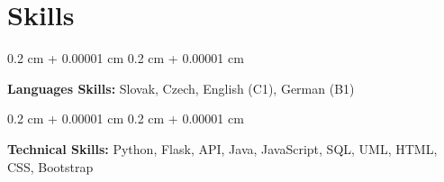 \documentclass[10pt, letterpaper]{article}
\newenvironment{onecolentry}{
    \begin{adjustwidth}{
        0.2 cm + 0.00001 cm
    }{
        0.2 cm + 0.00001 cm
    }
}{
    \end{adjustwidth}
} %
\begin{document}
    
    \section{Skills}



        
        \begin{onecolentry}
            \textbf{Languages Skills:} Slovak, Czech, English (C1), German (B1)
        \end{onecolentry}

        \vspace{0.2 cm}

        \begin{onecolentry}
            \textbf{Technical Skills:} Python, Flask, API, Java, JavaScript, SQL, UML, HTML, CSS, Bootstrap
        \end{onecolentry}


    
\end{document}
